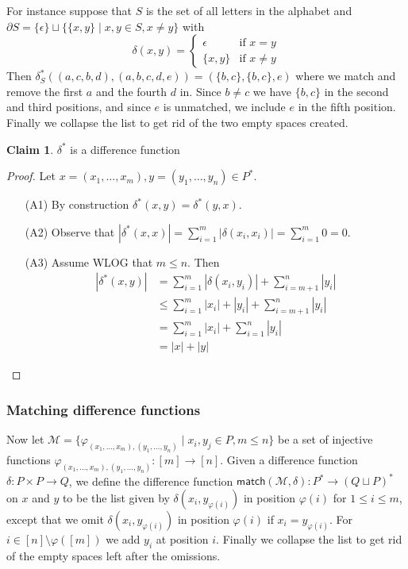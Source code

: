 \documentclass[acmsmall,review,anonymous]{acmart}\settopmatter{printfolios=true,printccs=false,printacmref=false}
\theoremstyle{definition}
\newtheorem{claim}{Claim}
\newcommand{\kw}[1]{\ensuremath{\mathsf{#1}}\xspace}
\newcommand{\match}{\ensuremath{\kw{match}}\xspace}
\begin{document}
For instance suppose that $S$ is the set of all letters in the alphabet and
$\partial S = \{\epsilon\} \sqcup \{\{x, y\} \; | \; x, y \in S, x \neq y\}$
with $$\delta(x, y) =
\begin{cases}
\epsilon & \text{if } x = y\\
\{x,y\} & \text{if } x \neq y
\end{cases}$$
Then $\delta_S^*((a, c, b, d), (a, b, c, d, e)) = (\{b, c\}, \{b, c\},
e)$ where we match and remove the first $a$ and the fourth $d$ in. Since $b \neq
c$ we have $\{b,c\}$ in the second and third positions, and since $e$ is
unmatched, we include $e$ in the fifth position. Finally we collapse the list to
get rid of the two empty spaces created.

\begin{claim}
$\delta^*$ is a difference function
\end{claim}
\begin{proof}
Let $x = (x_1, \ldots, x_m), y = (y_1, \ldots, y_n) \in P^*$.
\begin{enumerate}
  \item[(A1)]
  By construction $\delta^*(x, y) = \delta^*(y, x)$.
  \item[(A2)] Observe that $|\delta^*(x, x)| = \sum_{i=1}^m|\delta(x_i,
  x_i)| =  \sum_{i=1}^m 0 = 0$.
  \item[(A3)]
  Assume WLOG that $m \leq n$. Then
  \begin{align*}
|\delta^*(x, y)| &=
\sum_{i=1}^m|\delta(x_i, y_i)| + \sum_{i=m+1}^n |y_i|\\
&\leq \sum_{i=1}^m|x_i| + |y_i| + \sum_{i=m+1}^n |y_i|\\
&= \sum_{i=1}^m|x_i| + \sum_{i=1}^n |y_i|\\
&= |x| + |y|
\end{align*}
\end{enumerate}
\end{proof}
\subsubsection{Matching difference functions}
Now let $\mathcal{M} = \{\varphi_{(x_1, \ldots, x_m), (y_1, \ldots, y_n)} \; |
\; x_i, y_j \in P, m \leq n\}$ be a set of injective functions $\varphi_{(x_1,
\ldots, x_m), (y_1, \ldots, y_n)} : [m] \longrightarrow [n]$. Given a difference
function $\delta:
P \times P \longrightarrow Q$, we define the difference function
$\match(\mathcal{M}, \delta):P^* \longrightarrow (Q \sqcup P)^*$ on $x$
and $y$ to be the list given by $\delta(x_i, y_{\varphi(i)})$ in position
$\varphi(i)$ for $1 \leq i \leq m$, except that we omit $\delta(x_i,
y_{\varphi(i)})$ in position $\varphi(i)$ if $x_i = y_{\varphi(i)}$. For $i \in
[n] \setminus \varphi([m])$ we add $y_i$ at position $i$. Finally we collapse
the list to get rid of the empty spaces left after the omissions.
\end{document}
